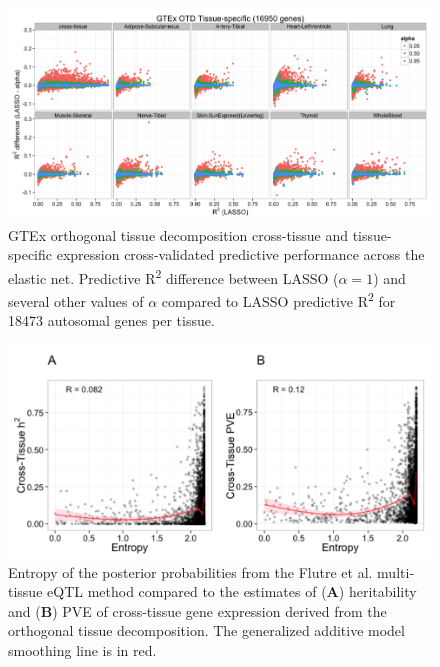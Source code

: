 \documentclass[]{article}
\begin{document}
\begin{figure}[htbp]
\centering
\includegraphics{GenArch_manuscript_files/figure-latex/ENctts-1.pdf}
\caption{GTEx orthogonal tissue decomposition cross-tissue and
tissue-specific expression cross-validated predictive performance across
the elastic net. Predictive R\textsuperscript{2} difference between
LASSO (\(\alpha = 1\)) and several other values of \(\alpha\) compared
to LASSO predictive R\textsuperscript{2} for 18473 autosomal genes per
tissue.}
\end{figure}

\begin{figure}[htbp]
\centering
\includegraphics{GenArch_manuscript_files/figure-latex/entropyCT-1.pdf}
\caption{Entropy of the posterior probabilities from the Flutre et al.
multi-tissue eQTL method compared to the estimates of (\textbf{A})
heritability and (\textbf{B}) PVE of cross-tissue gene expression
derived from the orthogonal tissue decomposition. The generalized
additive model smoothing line is in red.}
\end{figure}
\end{document}
